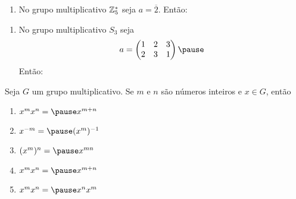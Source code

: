 \documentclass{beamer}
\begin{document}
    \begin{frame}
        \begin{exemplos}
            \begin{enumerate}[label={\arabic*})]
                \conti
                \item No grupo multiplicativo $\mathbb{Z}_5^*$ \pause seja $a = \overline{2}$. \pause Então:
                \seti
            \end{enumerate}
        \end{exemplos}
    \end{frame}

    \begin{frame}
        \begin{exemplos}
            \begin{enumerate}[label={\arabic*})]
                \conti
                \item No grupo multiplicativo $S_3$ \pause seja
                \[
                    a = \begin{pmatrix}
                        1 & 2 & 3\\ 2 & 3 & 1
                    \end{pmatrix} \pause
                \]
                Então:
            \end{enumerate}
        \end{exemplos}
    \end{frame}

    \begin{frame}
        \begin{proposicao}
            Seja $G$ um grupo multiplicativo. \pause Se $m$ e $n$ são números inteiros \pause e $x \in G$, \pause então \pause
            \begin{enumerate}[label={\arabic*})]
                \item $x^mx^n = \pause x^{m + n}$ \pause

                \item $x^{-m} = \pause (x^m)^{-1}$ \pause

                \item $(x^m)^n = \pause x^{mn}$ \pause

                \item $x^mx^n = \pause x^{m + n}$ \pause

                \item $x^mx^n = \pause x^nx^m$
            \end{enumerate}
        \end{proposicao}
    \end{frame}
\end{document}
